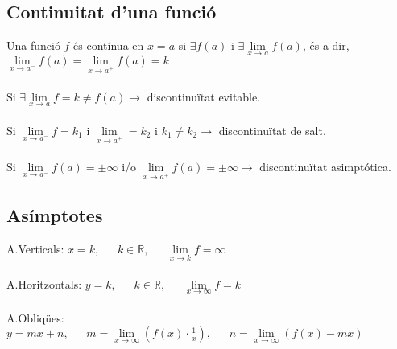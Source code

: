 \documentclass[12pt,a4paper]{article}
\newcommand{\set}[1]{\mathbb{#1}}
\begin{document}
\subsection{Continuitat d'una funció}
Una funció $f$ és contínua en $x=a$ si $\exists f(a)$ i $\exists\lim\limits_{x\to a} f(a)$, és a dir, $\lim\limits_{x\to a^-} f(a) = \lim\limits_{x\to a^+} f(a)=k$\\\\
Si  $\exists \lim\limits_{x\to a} f = k \neq f(a) \rightarrow$ discontinuïtat evitable.\\\\
Si $\lim\limits_{x\to a^-} f = k_1 $ i $\lim\limits_{x\to a^+} = k_2$ i $k_1 \neq k_2 \rightarrow$ discontinuïtat de salt.\\\\
Si $\lim\limits_{x\to a^-} f(a) = \pm \infty$ i/o $\lim\limits_{x\to a^+} f(a)=\pm\infty \rightarrow$ discontinuïtat asimptótica.
\subsection{Asímptotes}
A.Verticals: $x=k,\phantom{\rightarrow} k\in \set{R}, \phantom{\rightarrow}\lim\limits_{x\to k} f=\infty$\\\\
A.Horitzontals: $y=k, \phantom{\rightarrow} k\in\set{R}, \phantom{\rightarrow} \lim\limits_{x\to\infty} f=k$\\\\
A.Obliqües: $y=mx +n,\phantom{\rightarrow} m=\lim\limits_{x\to\infty}\left(f(x)\cdot\frac{1}{x}\right),\phantom{\rightarrow} n=\lim\limits_{x\to\infty}\left(f(x)-mx\right)$
\end{document}
